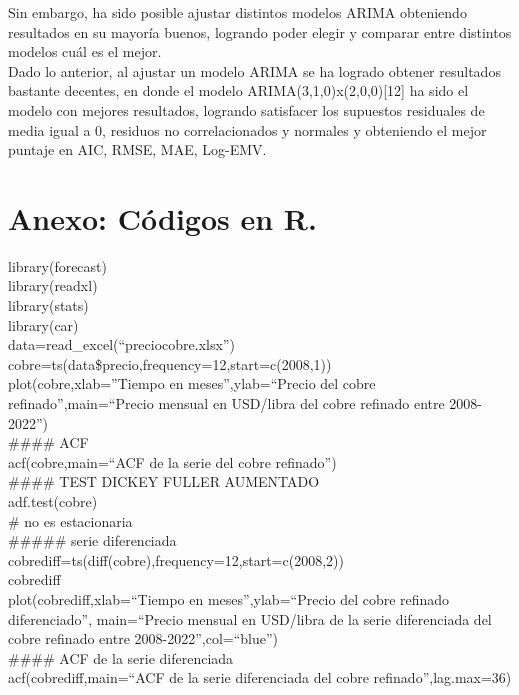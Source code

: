 \documentclass{report}
\begin{document}
Sin embargo, ha sido posible ajustar distintos modelos ARIMA obteniendo resultados en su mayoría buenos, logrando poder elegir y comparar entre distintos modelos cuál es el mejor.\\

Dado lo anterior, al ajustar un modelo ARIMA se ha logrado obtener resultados bastante decentes, en donde el modelo ARIMA(3,1,0)x(2,0,0)[12] ha sido el modelo con mejores resultados, logrando satisfacer los supuestos residuales de media igual a 0, residuos no correlacionados y normales y obteniendo el mejor puntaje en AIC, RMSE, MAE, Log-EMV. \\


\chapter{Anexo: Códigos en R.}\label{Anexo}
library(forecast)\\
library(readxl)\\
library(stats)\\
library(car)\\

data=read\_excel(``preciocobre.xlsx'')\\
cobre=ts(data\$precio,frequency=12,start=c(2008,1))\\
plot(cobre,xlab=''Tiempo en meses'',ylab=``Precio del cobre refinado'',main=``Precio mensual en USD/libra del cobre refinado entre 2008-2022'')\\

\#\#\#\# ACF\\
acf(cobre,main=``ACF de la serie del cobre refinado'')\\

\#\#\#\# TEST DICKEY FULLER AUMENTADO\\
adf.test(cobre) \\
\# no es estacionaria\\

\#\#\#\#\# serie diferenciada\\
cobrediff=ts(diff(cobre),frequency=12,start=c(2008,2))\\
cobrediff\\
plot(cobrediff,xlab=``Tiempo en meses'',ylab=``Precio del cobre refinado diferenciado'',
     main=``Precio mensual en USD/libra de la serie diferenciada del cobre refinado entre 2008-2022'',col=``blue'')\\

\#\#\#\# ACF de la serie diferenciada\\
acf(cobrediff,main=``ACF de la serie diferenciada del cobre refinado'',lag.max=36)\\
\end{document}
